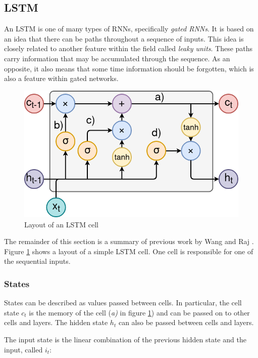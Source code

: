 \documentclass[conference]{IEEEtran}
\begin{document}
\subsection{LSTM}
An LSTM is one of many types of RNNs, specifically \textit{gated RNNs}. It is based on an idea that there can be paths throughout a sequence of inputs. This idea is closely related to another feature within the field called \textit{leaky units}. These paths carry information that may be accumulated through the sequence. As an opposite, it also means that some time information should be forgotten, which is also a feature within gated networks. \cite{dl-book}

\begin{figure}[h]
  \centering
      \includegraphics[scale=0.35]{LSTM}
        \caption{Layout of an LSTM cell}
        \label{fig:lstm}      
\end{figure}

The remainder of this section is a summary of previous work by Wang and Raj \cite{nnorigin}. Figure \ref{fig:lstm} shows a layout of a simple LSTM cell. One cell is responsible for one of the sequential inputs. 

\subsubsection{States}
States can be described as values passed between cells. In particular, the cell state $c_t$ is the memory of the cell (\textit{a)} in figure \ref{fig:lstm}) and can be passed on to other cells and layers. The hidden state $h_t$ can also be passed between cells and layers.

The input state is the linear combination of the previous hidden state and the input,
called $i_t$:
\end{document}
